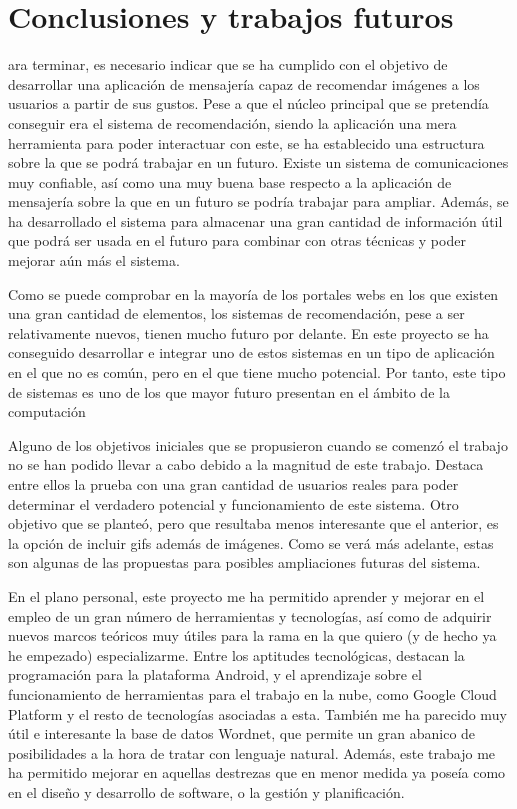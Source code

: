 \chapter{Conclusiones y trabajos futuros}
\label{chap:conclusiones}

\noindent
{}ara terminar, es necesario indicar que se ha cumplido con el objetivo de desarrollar una aplicación de mensajería capaz de recomendar imágenes a los usuarios a partir de sus gustos. Pese a que el núcleo principal que se pretendía conseguir era el sistema de recomendación, siendo la aplicación una mera herramienta para poder interactuar con este, se ha establecido una estructura sobre la que se podrá trabajar en un futuro. Existe un sistema de comunicaciones muy confiable, así como una muy buena base respecto a la aplicación de mensajería sobre la que en un futuro se podría trabajar para ampliar. Además, se ha desarrollado el sistema para almacenar una gran cantidad de información útil que podrá ser usada en el futuro para combinar con otras técnicas y poder mejorar aún más el sistema.

Como se puede comprobar en la mayoría de los portales webs en los que existen una gran cantidad de elementos, los sistemas de recomendación, pese a ser relativamente nuevos, tienen mucho futuro por delante. En este proyecto se ha conseguido desarrollar e integrar uno de estos sistemas en un tipo de aplicación en el que no es común, pero en el que tiene mucho potencial. Por tanto, este tipo de sistemas es uno de los que mayor futuro presentan en el ámbito de la computación

Alguno de los objetivos iniciales que se propusieron cuando se comenzó el trabajo no se han podido llevar a cabo debido a la magnitud de este trabajo. Destaca entre ellos la prueba con una gran cantidad de usuarios reales para poder determinar el verdadero potencial y funcionamiento de este sistema. Otro objetivo que se planteó, pero que resultaba menos interesante que el anterior, es la opción de incluir gifs además de imágenes. Como se verá más adelante, estas son algunas de las propuestas para posibles ampliaciones futuras del sistema.


En el plano personal, este proyecto me ha permitido aprender y mejorar en el empleo de un gran número de herramientas y tecnologías, así como de adquirir nuevos marcos teóricos muy útiles para la rama en la que quiero (y de hecho ya he empezado) especializarme. Entre los aptitudes tecnológicas, destacan la programación para la plataforma Android, y el aprendizaje sobre el funcionamiento de herramientas para el trabajo en la nube, como Google Cloud Platform y el resto de tecnologías asociadas a esta. También me ha parecido muy útil e interesante la base de datos Wordnet, que permite un gran abanico de posibilidades a la hora de tratar con lenguaje natural. Además, este trabajo me ha permitido mejorar en aquellas destrezas que en menor medida ya poseía como en el diseño y desarrollo de software, o la gestión y planificación.

